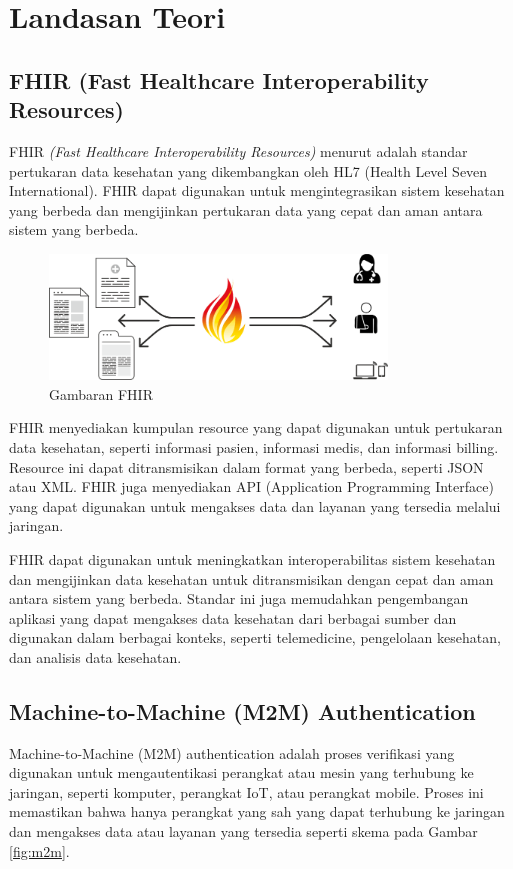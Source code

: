 \chapter{Landasan Teori}

\section{FHIR (Fast Healthcare Interoperability Resources)}
FHIR \textit{(Fast Healthcare Interoperability Resources)} menurut \cite{mark_l_braunstein_fhir_2022} adalah standar pertukaran data kesehatan yang dikembangkan oleh HL7 (Health Level Seven International). FHIR dapat digunakan untuk mengintegrasikan sistem kesehatan yang berbeda dan mengijinkan pertukaran data yang cepat dan aman antara sistem yang berbeda.
\begin{figure}[H]
    \centering
    \includegraphics[width=0.8\textwidth]{contents/chapter-3/FHIR-img-1.png}
    \caption{Gambaran FHIR}
    \label{fig:fhir}
\end{figure}
FHIR menyediakan kumpulan resource yang dapat digunakan untuk pertukaran data kesehatan, seperti informasi pasien, informasi medis, dan informasi billing. Resource ini dapat ditransmisikan dalam format yang berbeda, seperti JSON atau XML. FHIR juga menyediakan API (Application Programming Interface) yang dapat digunakan untuk mengakses data dan layanan yang tersedia melalui jaringan.

FHIR dapat digunakan untuk meningkatkan interoperabilitas sistem kesehatan dan mengijinkan data kesehatan untuk ditransmisikan dengan cepat dan aman antara sistem yang berbeda. Standar ini juga memudahkan pengembangan aplikasi yang dapat mengakses data kesehatan dari berbagai sumber dan digunakan dalam berbagai konteks, seperti telemedicine, pengelolaan kesehatan, dan analisis data kesehatan.


\section{Machine-to-Machine (M2M) Authentication}
Machine-to-Machine (M2M) authentication adalah proses verifikasi yang digunakan untuk mengautentikasi perangkat atau mesin yang terhubung ke jaringan, seperti komputer, perangkat IoT, atau perangkat mobile. Proses ini memastikan bahwa hanya perangkat yang sah yang dapat terhubung ke jaringan dan mengakses data atau layanan yang tersedia seperti skema pada Gambar \ref*{fig:m2m}.

